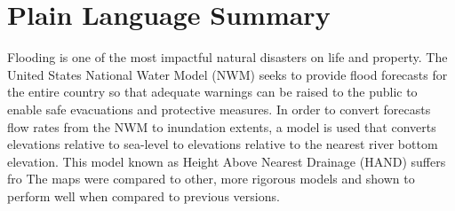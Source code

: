 \section*{Plain Language Summary}
Flooding is one of the most impactful natural disasters on life and property.
The United States National Water Model (NWM) seeks to provide flood forecasts for the entire country so that adequate warnings can be raised to the public to enable safe evacuations and protective measures.
In order to convert forecasts flow rates from the NWM to inundation extents, a model is used that converts elevations relative to sea-level to elevations relative to the nearest river bottom elevation.
This model known as Height Above Nearest Drainage (HAND) suffers fro
The maps were compared to other, more rigorous models and shown to perform well when compared to previous versions.
%
